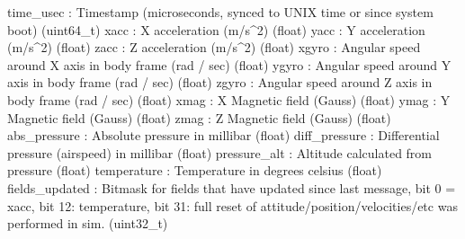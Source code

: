 \begin{DoxyVerb}
\begin{DoxyVerb}
\begin{DoxyVerb}
\begin{DoxyVerb}
\begin{DoxyVerb}
time_usec                 : Timestamp (microseconds, synced to UNIX time or since system boot) (uint64_t)
xacc                      : X acceleration (m/s^2) (float)
yacc                      : Y acceleration (m/s^2) (float)
zacc                      : Z acceleration (m/s^2) (float)
xgyro                     : Angular speed around X axis in body frame (rad / sec) (float)
ygyro                     : Angular speed around Y axis in body frame (rad / sec) (float)
zgyro                     : Angular speed around Z axis in body frame (rad / sec) (float)
xmag                      : X Magnetic field (Gauss) (float)
ymag                      : Y Magnetic field (Gauss) (float)
zmag                      : Z Magnetic field (Gauss) (float)
abs_pressure              : Absolute pressure in millibar (float)
diff_pressure             : Differential pressure (airspeed) in millibar (float)
pressure_alt              : Altitude calculated from pressure (float)
temperature               : Temperature in degrees celsius (float)
fields_updated            : Bitmask for fields that have updated since last message, bit 0 = xacc, bit 12: temperature, bit 31: full reset of attitude/position/velocities/etc was performed in sim. (uint32_t)\end{DoxyVerb}
 \mbox{\label{classpymavlink_1_1dialects_1_1v10_1_1MAVLink_a0b1430ba2281ae900c90c019bce3d4b2}} 

\end{DoxyVerb}
\end{DoxyVerb}
\end{DoxyVerb}
\end{DoxyVerb}

